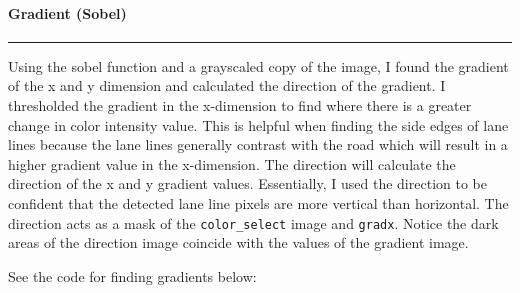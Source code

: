 \documentclass[11pt]{article}
\begin{document}
\hypertarget{gradient-sobel}{%
\paragraph{Gradient (Sobel)}\label{gradient-sobel}}

\begin{center}\rule{0.5\linewidth}{\linethickness}\end{center}

Using the sobel function and a grayscaled copy of the image, I found the
gradient of the x and y dimension and calculated the direction of the
gradient. I thresholded the gradient in the x-dimension to find where
there is a greater change in color intensity value. This is helpful when
finding the side edges of lane lines because the lane lines generally
contrast with the road which will result in a higher gradient value in
the x-dimension. The direction will calculate the direction of the x and
y gradient values. Essentially, I used the direction to be confident
that the detected lane line pixels are more vertical than horizontal.
The direction acts as a mask of the \texttt{color\_select} image and
\texttt{gradx}. Notice the dark areas of the direction image coincide
with the values of the gradient image.

See the code for finding gradients below:
\end{document}

